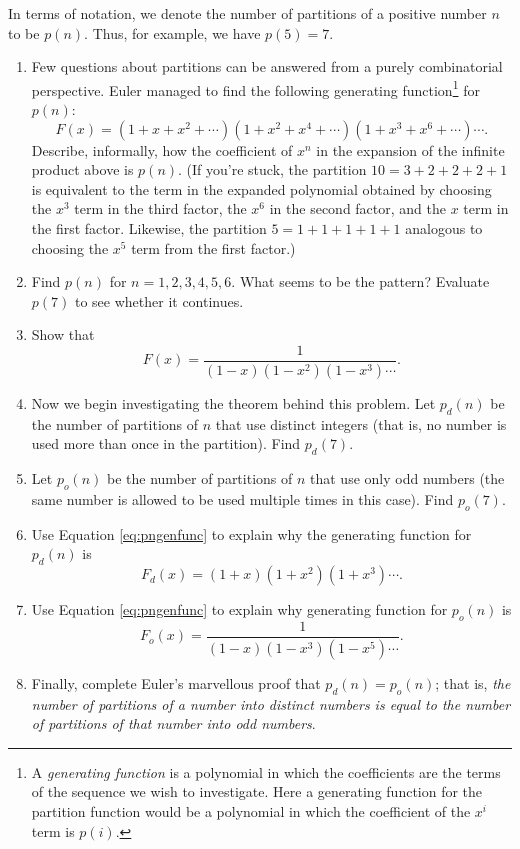 \documentclass[a4paper,10pt]{article}
\begin{document}
\begin{enumerate}
  In terms of notation, we denote the number of partitions of a positive number \(n\) to be \(p(n)\). Thus, for example,
  we have \(p(5)=7\).
  \begin{enumerate}
  \item Few questions about partitions can be answered from a purely combinatorial perspective. Euler managed
    to find the following generating function\footnote{A \emph{generating function} is a polynomial in which
      the coefficients are the terms of the sequence we wish to investigate. Here a generating function for the partition function
    would be a polynomial in which the coefficient of the \(x^i\) term is \(p(i)\).} for \(p(n)\):
    \begin{equation}\label{eq:pngenfunc}
      F(x)=(1+x+x^2+\cdots)(1+x^2+x^4+\cdots)(1+x^3+x^6+\cdots)\cdots.
    \end{equation}
    Describe, informally, how the coefficient of \(x^n\) in the expansion of the infinite product above is \(p(n)\).
    (If you're stuck, the partition \(10=3+2+2+2+1\) is equivalent to the term in the expanded polynomial obtained
    by choosing the \(x^3\) term in the third factor, the \(x^{6}\) in the second factor, and the \(x\) term in the first factor. Likewise,
    the partition \(5=1+1+1+1+1\) analogous to choosing the \(x^5\) term from the first factor.)
  \item Find \(p(n)\) for \(n=1,2,3,4,5,6\). What seems to be the pattern? Evaluate \(p(7)\) to see whether it continues.
  \item Show that
    \[
      F(x)=\frac{1}{(1-x)(1-x^2)(1-x^3)\cdots}.
    \]
  \item Now we begin investigating the theorem behind this problem. Let \(p_d(n)\) be the number of partitions of \(n\)
    that use distinct integers (that is, no number is used more than once in the partition).
    Find \(p_d(7)\).
  \item Let \(p_o(n)\) be the number of partitions of \(n\) that use only odd numbers (the same number is allowed to
    be used multiple times in this case). Find \(p_o(7)\).
  \item Use Equation \eqref{eq:pngenfunc} to explain why the generating function for \(p_d(n)\) is \[F_d(x)=(1+x)(1+x^2)(1+x^3)\cdots.\]
  \item Use Equation \eqref{eq:pngenfunc} to explain why generating function for \(p_o(n)\) is
    \[F_o(x)=\frac{1}{(1-x)(1-x^3)(1-x^5)\cdots}.\]
    \item Finally, complete Euler's marvellous proof that \(p_d(n)=p_o(n)\); that is, \emph{the number of partitions of a number
        into distinct numbers is equal to the number of partitions of that number into odd numbers}.
  \end{enumerate}
\end{enumerate}
\end{document}
